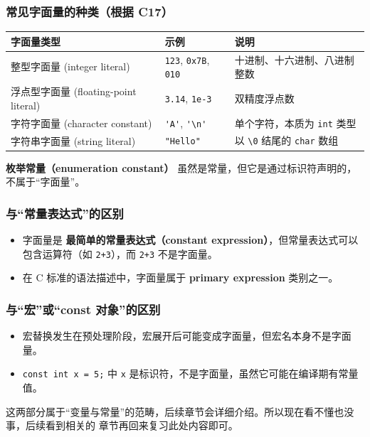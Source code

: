 \subsubsection{常见字面量的种类（根据 C17）}

\begin{center}
\begin{tabular}{lll}
\hline
\textbf{字面量类型} & \textbf{示例} & \textbf{说明} \\
\hline
整型字面量 (integer literal) & \verb|123|, \verb|0x7B|, \verb|010| & 十进制、十六进制、八进制整数 \\
浮点型字面量 (floating-point literal) & \verb|3.14|, \verb|1e-3| & 双精度浮点数 \\
字符字面量 (character constant) & \verb|'A'|, \verb|'\n'| & 单个字符，本质为 \verb|int| 类型 \\
字符串字面量 (string literal) & \verb|"Hello"| & 以 \verb|\0| 结尾的 \verb|char| 数组 \\
\hline
\end{tabular}
\end{center}

\textbf{枚举常量（enumeration constant）} 虽然是常量，但它是通过标识符声明的，不属于“字面量”。


\subsubsection{与“常量表达式”的区别}
\begin{itemize}
    \item 字面量是 \textbf{最简单的常量表达式（constant expression）}，但常量表达式可以包含运算符（如 \verb|2+3|），而 \verb|2+3| 不是字面量。
    \item 在 C 标准的语法描述中，字面量属于 \textbf{primary expression} 类别之一。
\end{itemize}

\subsubsection{与“宏”或“const 对象”的区别}
\begin{itemize}
    \item 宏替换发生在预处理阶段，宏展开后可能变成字面量，但宏名本身不是字面量。
    \item \verb|const int x = 5;| 中 \verb|x| 是标识符，不是字面量，虽然它可能在编译期有常量值。
\end{itemize}

这两部分属于“变量与常量”的范畴，后续章节会详细介绍。所以现在看不懂也没事，后续看到相关的
章节再回来复习此处内容即可。


